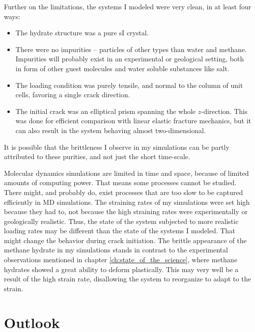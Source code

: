 Further on the limitations, the systems I modeled were very clean, in at least four ways: 
\begin{itemize}
\item The hydrate structure was a pure sI crystal. 
\item There were no impurities -- particles of other types than water and methane. Impurities will probably exist in an experimental or geological setting, both in form of other guest molecules and water soluble substances like salt. 
\item The loading condition was purely tensile, and normal to the column of unit cells, favoring a single crack direction.
\item The initial crack was an elliptical prism spanning the whole $z$-direction. This was done for efficient comparison with linear elastic fracture mechanics, but it can also result in the system behaving almost two-dimensional. 
\end{itemize}
It is possible that the brittleness I observe in my simulations can be partly attributed to these purities, and not just the short time-scale.

Molecular dynamics simulations are limited in time and space, because of limited amounts of computing power. That means some processes cannot be studied. There might, and probably do, exist processes that are too slow to be captured efficiently in MD simulations. The straining rates of my simulations were set high because they had to, not because the high straining rates were experimentally or geologically realistic. Thus, the state of the system subjected to more realistic loading rates may be different than the state of the systems I modeled. That might change the behavior during crack initiation. The brittle appearance of the methane hydrate in my simulations stands in contrast to the experimental observations mentioned in chapter \ref{ch:state_of_the_science}, where methane hydrates showed a great ability to deform plastically. This may very well be a result of the high strain rate, disallowing the system to reorganize to adapt to the strain.


\section{Outlook}

